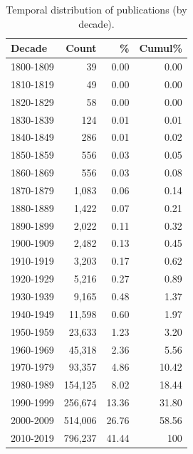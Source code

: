 \documentclass[11pt]{article}
\begin{document}
\begin{table}[htbp]
\centering

\begin{tabular}{@{}lrrr@{}}
\toprule
\textbf{Decade} & \textbf{Count} & \% & \textbf{Cumul}\% \\
\midrule
1800-1809 & 39 & 0.00 & 0.00 \\
1810-1819 & 49 & 0.00 & 0.00 \\
1820-1829 & 58 & 0.00 & 0.00 \\
1830-1839 & 124 & 0.01 & 0.01 \\
1840-1849 & 286 & 0.01 & 0.02 \\
1850-1859 & 556 & 0.03 & 0.05 \\
1860-1869 & 556 & 0.03 & 0.08 \\
1870-1879 & 1,083 & 0.06 & 0.14 \\
1880-1889 & 1,422 & 0.07 & 0.21 \\
1890-1899 & 2,022 & 0.11 & 0.32 \\
1900-1909 & 2,482 & 0.13 & 0.45 \\
1910-1919 & 3,203 & 0.17 & 0.62 \\
1920-1929 & 5,216 & 0.27 & 0.89 \\
1930-1939 & 9,165 & 0.48 & 1.37 \\
1940-1949 & 11,598 & 0.60 & 1.97 \\
1950-1959 & 23,633 & 1.23 & 3.20 \\
1960-1969 & 45,318 & 2.36 & 5.56 \\
1970-1979 & 93,357 & 4.86 & 10.42 \\
1980-1989 & 154,125 & 8.02 & 18.44 \\
1990-1999 & 256,674 & 13.36 & 31.80 \\
2000-2009 & 514,006 & 26.76 & 58.56 \\
2010-2019 & 796,237 & 41.44 & 100 \\
\bottomrule
\end{tabular}
\caption{Temporal distribution of publications (by decade).}
\label{tab:temporal-dist}
\end{table}
\end{document}
